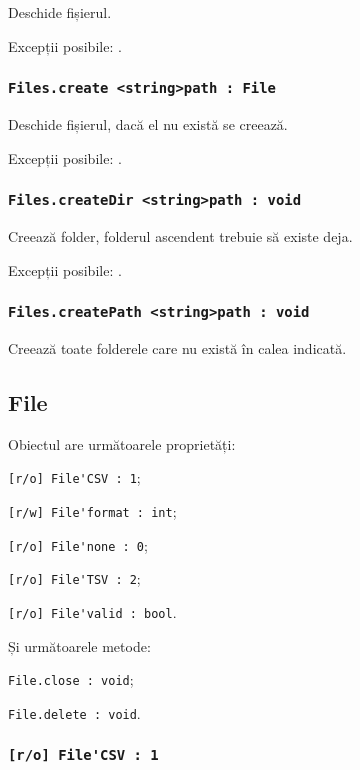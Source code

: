 Deschide fișierul.

Excepții posibile: .

\subsubsection{\lstinline|Files.create <string>path : File|}

Deschide fișierul, dacă el nu există se creează.

Excepții posibile: .

\subsubsection{\lstinline|Files.createDir <string>path : void|}

Creează folder, folderul ascendent trebuie să existe deja.

Excepții posibile: .

\subsubsection{\lstinline|Files.createPath <string>path : void|}

Creează toate folderele care nu există în calea indicată.

\subsection{{\color{orange} File}}

Obiectul \file{} are următoarele proprietăți:
\begin{icItems}
	\item \lstinline|[r/o] File'CSV : 1|;
	\item \lstinline|[r/w] File'format : int|;
	\item \lstinline|[r/o] File'none : 0|;
	\item \lstinline|[r/o] File'TSV : 2|;
	\item \lstinline|[r/o] File'valid : bool|.
\end{icItems}

Și următoarele metode:
\begin{icItems}
	\item \lstinline|File.close : void|;
	\item \lstinline|File.delete : void|.
\end{icItems}

\subsubsection{\lstinline|[r/o] File'CSV : 1|}

